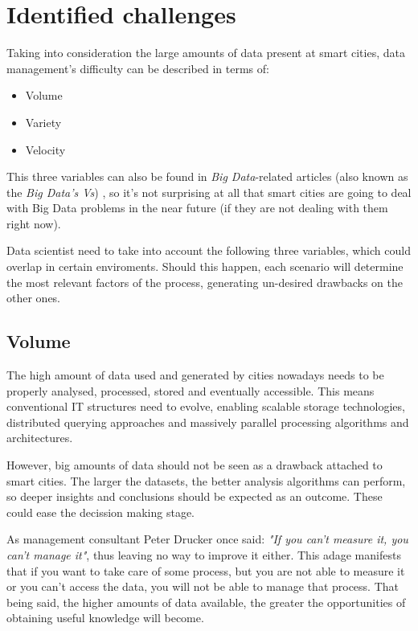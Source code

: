 \section{Identified challenges}

Taking into consideration the large amounts of data present at smart cities, data management's difficulty can be described in terms of:
\begin{itemize}
	\item Volume
	\item Variety
	\item Velocity
\end{itemize}

This three variables can also be found in \textit{Big Data}-related articles (also known as the \textit{Big Data's Vs}) \cite{zikopoulos2011understanding,russom2011big}, so it's not surprising at all that smart cities are going to deal with Big Data problems in the near future (if they are not dealing with them right now).

Data scientist need to take into account the following three variables, which could overlap in certain enviroments. Should this happen, each scenario will determine the most relevant factors of the process, generating un-desired drawbacks on the other ones.

\subsection{Volume}

The high amount of data used and generated by cities nowadays needs to be properly analysed, processed, stored and eventually accessible. This means conventional IT structures need to evolve, enabling scalable storage technologies, distributed querying approaches and massively parallel processing algorithms and architectures.


However, big amounts of data should not be seen as a drawback attached to smart cities. The larger the datasets, the better analysis algorithms can perform, so deeper insights and conclusions should be expected as an outcome. These could ease the decission making stage.

As management consultant Peter Drucker once said: \textit{"If you can't measure it, you can't manage it"}, thus leaving no way to improve it either. This adage manifests that if you want to take care of some process, but you are not able to measure it or you can't access the data, you will not be able to manage that process. That being said, the higher amounts of data available, the greater the opportunities of obtaining useful knowledge will become.


